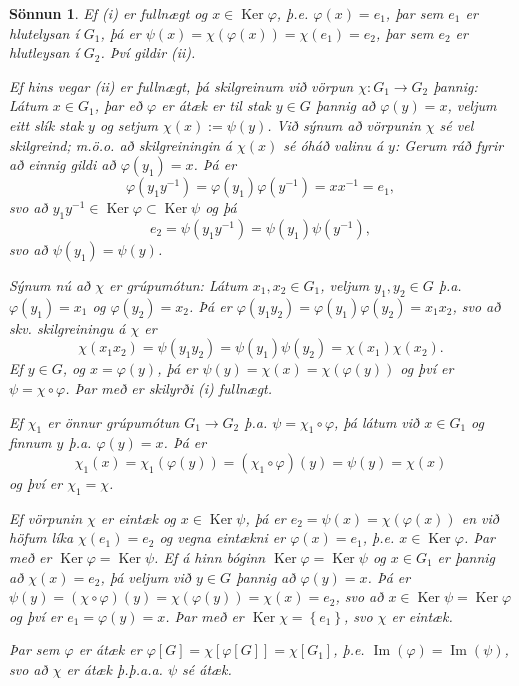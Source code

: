 \documentclass[a4paper,icelandic,11pt]{book}
\theoremstyle{plain}
\newtheorem*{sonnun}{Sönnun}
\DeclareMathOperator{\im}{Im} %
\DeclareMathOperator{\Ker}{Ker} %
\begin{document}
\begin{sonnun}
  Ef (i) er fullnægt og $x\in\Ker\varphi$, þ.e. $\varphi(x) = e_1$, þar sem
  $e_1$ er hlutelysan í $G_1$, þá er $\psi(x) = \chi(\varphi(x)) = \chi(e_1) =
  e_2$, þar sem $e_2$ er hlutleysan í $G_2$. Því gildir (ii).

  Ef hins vegar (ii) er fullnægt, þá skilgreinum við vörpun $\chi:G_1\to G_2$
  þannig: Látum $x\in G_1$, þar eð $\varphi$ er átæk er til stak $y\in G$ þannig
  að $\varphi(y) = x$, veljum eitt slík stak $y$ og setjum $\chi(x) := \psi(y)$.
  Við sýnum að vörpunin $\chi$ sé \emph{vel skilgreind}; m.ö.o. að
  skilgreiningin á $\chi(x)$ sé óháð valinu á $y$: Gerum ráð fyrir að einnig
  gildi að $\varphi(y_1) = x$. Þá er 
  \[
  \varphi(y_1 y^{-1}) 
  = \varphi(y_1)\varphi(y^{-1}) 
  = xx^{-1} 
  = e_1,
  \]
  svo að $y_1y^{-1}\in \Ker\varphi\subset \Ker\psi$ og þá
  \[
  e_2 
  = \psi(y_1y^{-1})
  =\psi(y_1)\psi(y^{-1}),
  \]
  svo að $\psi(y_1) = \psi(y)$.

  Sýnum nú að $\chi$ er \emph{grúpumótun:} Látum
  $x_1,x_2\in G_1$, veljum $y_1,y_2\in G$ þ.a.  $\varphi(y_1) = x_1$ og
  $\varphi(y_2) = x_2$. Þá er $\varphi(y_1 y_2) = \varphi(y_1)\varphi(y_2) = x_1
  x_2$, svo að skv. skilgreiningu á $\chi$ er 
  \[
  \chi(x_1 x_2) 
  = \psi(y_1y_2)
  =\psi(y_1)\psi(y_2)
  =\chi(x_1)\chi(x_2).
  \]
  Ef $y\in G$, og
  $x = \varphi(y)$, þá er $\psi(y) = \chi(x) = \chi(\varphi(y))$ og því er
  $\psi=\chi\circ\varphi$. Þar með er skilyrði (i) fullnægt. 
  
  Ef $\chi_1$ er
  önnur grúpumótun $G_1\to G_2$ þ.a. $\psi=\chi_1\circ\varphi$, þá látum við
  $x\in G_1$ og finnum $y$ þ.a. $\varphi(y) = x$. Þá er 
  \[
  \chi_1(x) 
  = \chi_1(\varphi(y)) 
  = (\chi_1\circ\varphi)(y) 
  = \psi(y) 
  = \chi(x)
  \]
  og því er $\chi_1 = \chi$.

  Ef vörpunin $\chi$ er eintæk og $x\in\Ker\psi$, þá er $e_2 = \psi(x) =
  \chi(\varphi(x))$ en við höfum líka $\chi(e_1) = e_2$ og vegna eintækni er
  $\varphi(x) = e_1$, þ.e. $x\in\Ker\varphi$. Þar með er $\Ker\varphi =
  \Ker\psi$. Ef á hinn bóginn $\Ker\varphi = \Ker\psi$ og $x\in G_1$ er þannig
  að $\chi(x) = e_2$, þá veljum við $y\in G$ þannig að $\varphi(y) = x$. Þá er
  $\psi(y) = (\chi\circ\varphi)(y) = \chi(\varphi(y)) = \chi(x) = e_2$, svo að
  $x\in \Ker\psi = \Ker\varphi$ og því er $e_1 = \varphi(y) = x$. Þar með er
  $\Ker\chi = \left\{ e_1 \right\}$, svo $\chi$ er eintæk.

  Þar sem $\varphi$ er átæk er $\varphi[G] = \chi[\varphi[G]] = \chi[G_1]$, þ.e.
  $\im(\varphi) = \im(\psi)$, svo að $\chi$ er átæk þ.þ.a.a. $\psi$ sé átæk.
\end{sonnun}
\end{document}

